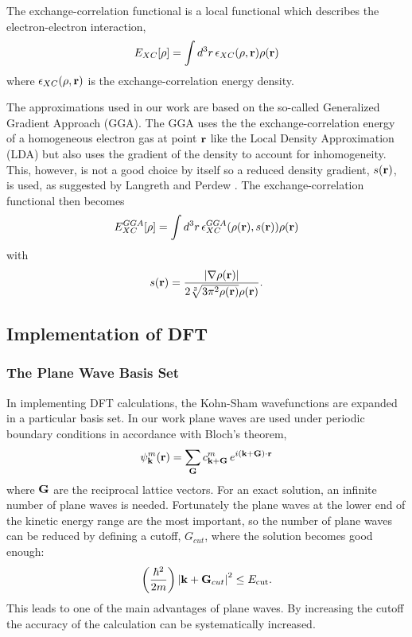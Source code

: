 The exchange-correlation functional is a local functional which describes the electron-electron interaction,
\begin{equation}
\label{eq:XCfunctional}
 E_{XC}[\rho] = \int d^3r\, \epsilon_{XC}(\rho, {\mathrm{\mathbf{\bm{r}}}})\rho({\mathrm{\mathbf{\bm{r}}}})
\end{equation}
where $\epsilon_{XC}(\rho, {\mathrm{\mathbf{\bm{r}}}})$ is the exchange-correlation energy density.

The approximations used in our work are based on the so-called Generalized Gradient Approach (GGA). The GGA uses the the exchange-correlation energy of a homogeneous electron gas at point ${\mathrm{\mathbf{\bm{r}}}}$ like the Local Density Approximation (LDA) \cite{kohn1965} but also uses the gradient of the density to account for inhomogeneity. This, however, is not a good choice by itself so a reduced density gradient, $s({\mathrm{\mathbf{\bm{r}}}})$, is used, as suggested by Langreth and Perdew \cite{langreth1977}. The exchange-correlation functional then becomes
\begin{equation}
  E_{XC}^{GGA}[\rho] = \int d^3r\, \epsilon_{XC}^{GGA}(\rho({\mathrm{\mathbf{\bm{r}}}}), s({\mathrm{\mathbf{\bm{r}}}}))\rho({\mathrm{\mathbf{\bm{r}}}})
\end{equation}
with
\begin{equation}
\label{eq:GGAreducedDensityGradient}
 s({\mathrm{\mathbf{\bm{r}}}}) = \frac{\left|\nabla \rho({\mathrm{\mathbf{\bm{r}}}})\right|}{2\sqrt[3]{3\pi^2\rho({\mathrm{\mathbf{\bm{r}}}})} \rho({\mathrm{\mathbf{\bm{r}}}})}.
\end{equation}

\subsection{Implementation of DFT}
\label{sec:methods-dft-implemetnation}

\subsubsection{The Plane Wave Basis Set}
In implementing DFT calculations, the Kohn-Sham wavefunctions are expanded in a particular basis set. In our work plane waves are used under periodic boundary conditions in accordance with Bloch's theorem,
\begin{equation}
\label{eq:blochsTherom}
 \psi_{\mathrm{\mathbf{\bm{k}}}}^{m}({\mathrm{\mathbf{\bm{r}}}}) = \sum_{\mathrm{\mathbf{\bm{G}}}}c_{{\mathrm{\mathbf{\bm{k}}}} + {\mathrm{\mathbf{\bm{G}}}}}^m\, e^{i({\mathrm{\mathbf{\bm{k}}}}+{\mathrm{\mathbf{\bm{G}}}})\cdot{\ensuremath{\mathrm{\mathbf{\bm{r}}}}}}
\end{equation}
where ${\mathrm{\mathbf{\bm{G}}}}$ are the reciprocal lattice vectors. %
For an exact solution, an infinite number of plane waves is needed. Fortunately the plane waves at the lower end of the kinetic energy range are the most important, so the number of plane waves can be reduced by defining a cutoff, $G_{cut}$, where the solution becomes good enough:
\begin{equation}
 \left( \frac{\hbar^2}{2m} \right) \left| {\mathrm{\mathbf{\bm{k}}}} + {\mathrm{\mathbf{\bm{G}}}}_{cut} \right|^2 \le E_\mathrm{cut}.
\end{equation}
This leads to one of the main advantages of plane waves. By increasing the cutoff the accuracy of the calculation can be systematically increased. 

